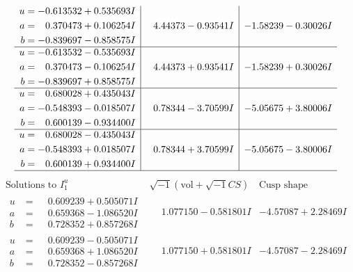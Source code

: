 \documentclass[1p]{elsarticle_modified}
\theoremstyle{definition}
\newcommand{\I}{\sqrt{-1}}
\begin{document}
$$\begin{array}{c|c|c}
\begin{aligned}
u &= -0.613532 + 0.535693 I \\
a &= \phantom{-}0.370473 + 0.106254 I \\
b &= -0.839697 - 0.858575 I\end{aligned}
 & \phantom{-}4.44373 - 0.93541 I & -1.58239 - 0.30026 I \\ \hline\begin{aligned}
u &= -0.613532 - 0.535693 I \\
a &= \phantom{-}0.370473 - 0.106254 I \\
b &= -0.839697 + 0.858575 I\end{aligned}
 & \phantom{-}4.44373 + 0.93541 I & -1.58239 + 0.30026 I \\ \hline\begin{aligned}
u &= \phantom{-}0.680028 + 0.435043 I \\
a &= -0.548393 - 0.018507 I \\
b &= \phantom{-}0.600139 - 0.934400 I\end{aligned}
 & \phantom{-}0.78344 - 3.70599 I & -5.05675 + 3.80006 I \\ \hline\begin{aligned}
u &= \phantom{-}0.680028 - 0.435043 I \\
a &= -0.548393 + 0.018507 I \\
b &= \phantom{-}0.600139 + 0.934400 I\end{aligned}
 & \phantom{-}0.78344 + 3.70599 I & -5.05675 - 3.80006 I\\
 \hline 
 \end{array}$$\newpage$$\begin{array}{c|c|c}  
\text{Solutions to }I^u_{1}& \I (\text{vol} + \sqrt{-1}CS) & \text{Cusp shape}\\
 \hline 
\begin{aligned}
u &= \phantom{-}0.609239 + 0.505071 I \\
a &= \phantom{-}0.659368 - 1.086520 I \\
b &= \phantom{-}0.728352 + 0.857268 I\end{aligned}
 & \phantom{-}1.077150 - 0.581801 I & -4.57087 + 2.28469 I \\ \hline\begin{aligned}
u &= \phantom{-}0.609239 - 0.505071 I \\
a &= \phantom{-}0.659368 + 1.086520 I \\
b &= \phantom{-}0.728352 - 0.857268 I\end{aligned}
 & \phantom{-}1.077150 + 0.581801 I & -4.57087 - 2.28469 I \\ \hline\begin{aligned}

\end{aligned}
\end{array}$$
\end{document}
